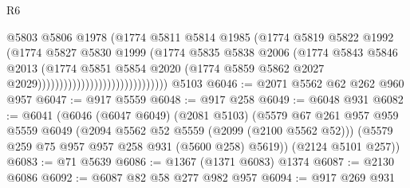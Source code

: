\begin{lexlean}{R6}
\begin{coremodule}
                                                  @5803
                                                  @5806
                                                  @1978
                                                  (@1774
                                                    @5811
                                                    @5814
                                                    @1985
                                                    (@1774
                                                      @5819
                                                      @5822
                                                      @1992
                                                      (@1774
                                                        @5827
                                                        @5830
                                                        @1999
                                                        (@1774
                                                          @5835
                                                          @5838
                                                          @2006
                                                          (@1774
                                                            @5843
                                                            @5846
                                                            @2013
                                                            (@1774
                                                              @5851
                                                              @5854
                                                              @2020
                                                              (@1774
                                                                @5859
                                                                @5862
                                                                @2027
                                                                @2029))))))))))))))))))))))))))))))
    @5103
@6046 := @2071 @5562 @62 @262 @960 @957
@6047 := @917 @5559
@6048 := @917 @258
@6049 := @6048 @931
@6082 := @6041
    (@6046
      (@6047 @6049)
      (@2081 @5103)
      (@5579
        @67
        @261
        @957
        @959
        @5559
        @6049
        (@2094 @5562 @52 @5559 (@2099 (@2100 @5562 @52)))
        (@5579 @259 @75 @957 @957 @258 @931 (@5600 @258) @5619))
      (@2124 @5101 @257))
@6083 := @71 @5639
@6086 := @1367 (@1371 @6083) @1374
@6087 := @2130 @6086
@6092 := @6087 @82 @58 @277 @982 @957
@6094 := @917 @269 @931

\end{coremodule}
\end{lexlean}
